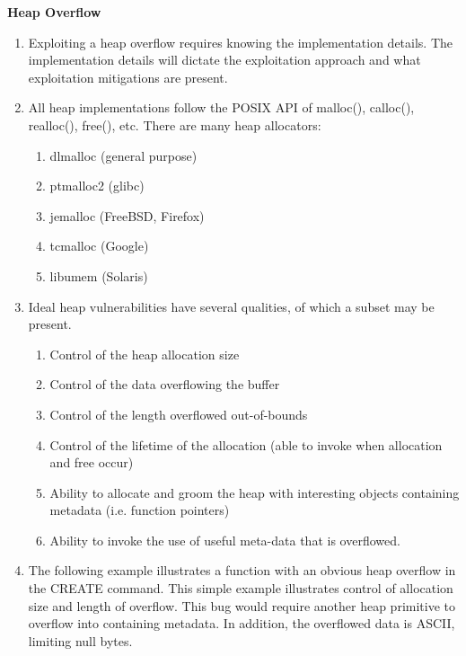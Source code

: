 \documentclass[12pt]{Training}
\begin{document}
\textbf{Heap Overflow}
\begin{enumerate}
  \item Exploiting a heap overflow requires knowing the implementation details. The implementation details will dictate the exploitation approach and what exploitation mitigations are present.
  \item All heap implementations follow the POSIX API of malloc(), calloc(), realloc(), free(), etc. There are many heap allocators:
    \begin{enumerate}
      \item dlmalloc (general purpose)
      \item ptmalloc2 (glibc)
      \item jemalloc (FreeBSD, Firefox)
      \item tcmalloc (Google)
      \item libumem (Solaris)
    \end{enumerate}
  \item Ideal heap vulnerabilities have several qualities, of which a subset may be present.
    \begin{enumerate}
      \item Control of the heap allocation size
      \item Control of the data overflowing the buffer
      \item Control of the length overflowed out-of-bounds
      \item Control of the lifetime of the allocation (able to invoke when allocation and free occur)
      \item Ability to allocate and groom the heap with interesting objects containing metadata (i.e. function pointers)
      \item Ability to invoke the use of useful meta-data that is overflowed.
    \end{enumerate}
  \item The following example illustrates a function with an obvious heap overflow in the CREATE command. This simple example illustrates control of allocation size and length of overflow. This bug would require another heap primitive to overflow into containing metadata. In addition, the overflowed data is ASCII, limiting null bytes.
\end{enumerate}
\end{document}
